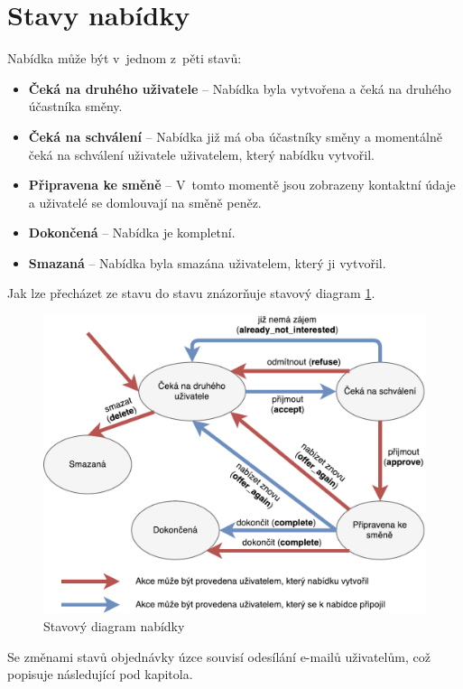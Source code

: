 \section{Stavy nabídky}
\label{nur:status}

Nabídka může být v~jednom z~pěti stavů:
\begin{itemize}
    \item \textbf{Čeká na druhého uživatele} -- Nabídka byla vytvořena a čeká na druhého účastníka směny.
    \item \textbf{Čeká na schválení} -- Nabídka již má oba účastníky směny a momentálně čeká na schválení uživatele uživatelem, který nabídku vytvořil.
    \item \textbf{Připravena ke směně} -- V~tomto momentě jsou zobrazeny kontaktní údaje a uživatelé se domlouvají na směně peněz.
    \item \textbf{Dokončená} -- Nabídka je kompletní.
    \item \textbf{Smazaná} -- Nabídka byla smazána uživatelem, který ji vytvořil.
\end{itemize}
Jak lze přecházet ze stavu do stavu znázorňuje stavový diagram \ref{fig:implementation:state-diagram}.
\begin{figure}[h]
    \centering
    \includegraphics[width=1.0\textwidth]{media/state-diagram-cs}
    \caption{Stavový diagram nabídky}
    \label{fig:implementation:state-diagram}
\end{figure}

Se změnami stavů objednávky úzce souvisí odesílání e-mailů uživatelům, což popisuje následující pod kapitola.